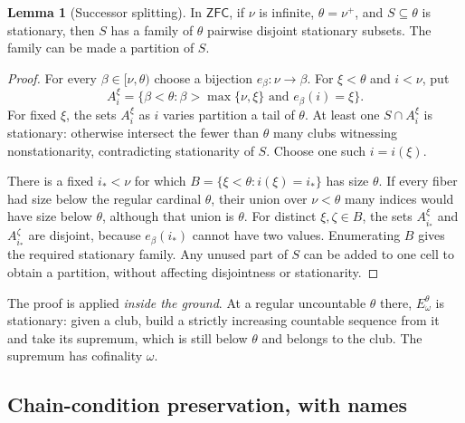 \documentclass[11pt,letterpaper]{article}
\theoremstyle{definition}
\newtheorem{lemma}[definition]{Lemma}
\numberwithin{equation}{section}
\newcommand{\ZFC}{\mathsf{ZFC}}
\begin{document}
\begin{lemma}[Successor splitting]\label{lem:ulam}
In $\ZFC$, if $\nu$ is infinite, $\theta=\nu^+$, and
$S\subseteq\theta$ is stationary, then $S$ has a family of $\theta$
pairwise disjoint stationary subsets. The family can be made a
partition of $S$.
\end{lemma}
\begin{proof}
For every $\beta\in[\nu,\theta)$ choose a bijection
$e_\beta:\nu\to\beta$. For $\xi<\theta$ and $i<\nu$, put
\[
A_i^\xi=\{\beta<\theta:\beta>\max\{\nu,\xi\}
\text{ and }e_\beta(i)=\xi\}.
\]
For fixed $\xi$, the sets $A_i^\xi$ as $i$ varies partition a tail of
$\theta$. At least one $S\cap A_i^\xi$ is stationary: otherwise
intersect the fewer than $\theta$ many clubs witnessing
nonstationarity, contradicting stationarity of $S$. Choose one such
$i=i(\xi)$.

There is a fixed $i_*<\nu$ for which
$B=\{\xi<\theta:i(\xi)=i_*\}$ has size $\theta$. If every fiber had
size below the regular cardinal $\theta$, their union over
$\nu<\theta$ many indices would have size below $\theta$, although
that union is $\theta$.
For distinct $\xi,\zeta\in B$, the sets
$A_{i_*}^\xi$ and $A_{i_*}^\zeta$ are disjoint, because
$e_\beta(i_*)$ cannot have two values. Enumerating $B$ gives the
required stationary family. Any unused part of $S$ can be added to
one cell to obtain a partition, without affecting disjointness or
stationarity.
\end{proof}

The proof is applied \emph{inside the ground}. At a regular
uncountable $\theta$ there, $E^\theta_\omega$ is stationary: given a
club, build a strictly increasing countable sequence from it and take
its supremum, which is still below $\theta$ and belongs to the club.
The supremum has cofinality $\omega$.

\subsection{Chain-condition preservation, with names}\label{app:forcing}
\end{document}
